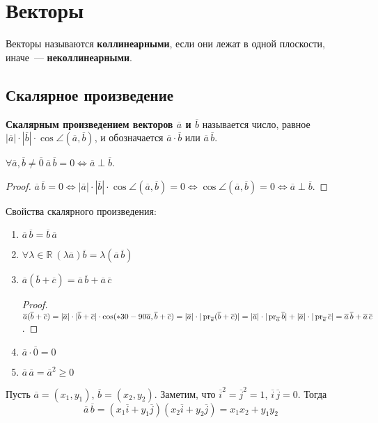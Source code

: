 \section{Векторы}
 Векторы называются \textbf{коллинеарными}, если они лежат в одной плоскости, иначе~--- \textbf{неколлинеарными}.

\subsection{Скалярное произведение}
 \textbf{Скалярным произведением векторов $\overline a$ и $\overline b$} называется число, равное $|\overline a| \cdot |\overline b| \cdot \cos \angle(\overline a, \overline b)$, и обозначается $\overline a \cdot \overline b$ или $\overline a\,\overline b$.

\begin{statement}
$\forall \overline a, \overline b \neq \overline 0 \ \overline a\,\overline b = 0 \Leftrightarrow \overline a \perp \overline b$.
\end{statement}
\begin{proof}
$\overline a\,\overline b = 0 \Leftrightarrow
|\overline a| \cdot |\overline b| \cdot \cos \angle(\overline a, \overline b) = 0 \Leftrightarrow
\cos \angle(\overline a, \overline b) = 0 \Leftrightarrow
\overline a \perp \overline b$.
\end{proof}

Свойства скалярного произведения:
\begin{enumerate}
	\item $\overline a\,\overline b = \overline b\,\overline a$
	\item $\forall \lambda \in \mathbb R \ (\lambda \overline a) \overline b = \lambda (\overline a\,\overline b)$
	\item $\overline a (\overline b + \overline c) = \overline a\,\overline b + \overline a\,\overline c$
	\begin{proof}
	$\overline a (\overline b + \overline c) = 
	|\overline a| \cdot |\overline b + \overline c| \cdot \cos (*30-90\overline a, \overline b + \overline c) =
	|\overline a| \cdot |\operatorname{pr}_{\overline a} (\overline b + \overline c)| =
	|\overline a| \cdot |\operatorname{pr}_{\overline a} \overline b| + |\overline a| \cdot |\operatorname{pr}_{\overline a} \overline c| =
	\overline a\,\overline b + \overline a\,\overline c$.
	\end{proof}
	\item $\overline a \cdot \overline 0 = 0$
	\item $\overline a\,\overline a = \overline a^2 \geqslant 0$
\end{enumerate}

Пусть $\overline a = (x_1, y_1)$, $\overline b = (x_2, y_2)$.
Заметим, что $\overline i^2 = \overline j^2 = 1$, $\overline i\,\overline j = 0$.
Тогда
\begin{equation*}
\overline a\,\overline b =
(x_1 \overline i + y_1 \overline j) (x_2 \overline i + y_2 \overline j) =
x_1 x_2 + y_1 y_2
\end{equation*}